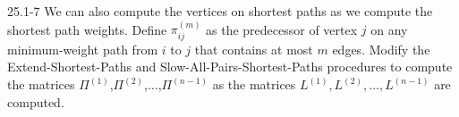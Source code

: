 \begin{problem}{25.1-7}
  We can also compute the vertices on shortest paths as we compute the shortest path weights.  Define $\pi^{(m)}_{ij}$
  as the predecessor of vertex $j$ on any minimum-weight path from $i$ to $j$ that contains at most $m$ edges.  Modify
  the Extend-Shortest-Paths and Slow-All-Pairs-Shortest-Paths procedures to compute the matrices
  $\Pi^{(1)}$,$\Pi^{(2)}$,$\ldots$,$\Pi^{(n-1)}$ as the matrices $L^{(1)},L^{(2)},\ldots,L^{(n-1)}$ are computed.
\end{problem}



